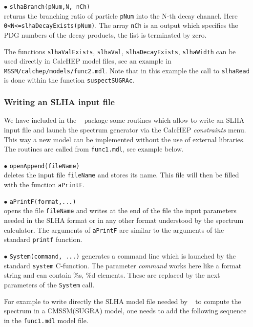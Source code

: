 \documentclass[12pt,a4paper]{article}
\begin{document}
\noindent
$\bullet$ \verb|slhaBranch(pNum,N, nCh)|\\
returns the  branching ratio of  particle \verb|pNum| into the N-th decay channel. Here\\
\noindent \verb|0<N<=slhaDecayExists(pNum)|.
The array \verb|nCh| is an output which specifies the  PDG numbers of the decay products, the list  
is terminated by zero.

The functions \verb|slhaValExists|, \verb|slhaVal|, 
\verb|slhaDecayExists|, \verb|slhaWidth| can be used directly 
in CalcHEP model files, see an example in \\
\verb|MSSM/calchep/models/func2.mdl|. Note that in this example the 
call to \verb|slhaRead| is done within the function \verb|suspectSUGRAc|.


\subsubsection{Writing an SLHA input file}
We have included in the \micro~ package some routines which allow to write
an SLHA input file and launch the spectrum generator via the CalcHEP 
{\it constraints} menu.  This way a new model can be implemented without the use of
external libraries. The routines are called from \verb|func1.mdl|, see example below.

\noindent
$\bullet$ \verb|openAppend(fileName)|\\
deletes the input file \verb|fileName| and stores its name. This file will then be filled with
the function \verb|aPrintF|.

\noindent
$\bullet$ \verb|aPrintF(format,...)|\\
opens the file \verb|fileName| and writes at the end of the file the input parameters needed in the SLHA format or in any other format
understood by the spectrum calculator.  The arguments of 
\verb|aPrintF| are similar to the arguments of the standard \verb|printf| function.

\noindent
$\bullet$ \verb|System(command, ...)|  
generates a command line which is launched by the standard \verb|system|
C-function. The parameter {\it command} works here like a format string and can contain \%s, \%d elements. 
These are replaced by the next parameters  of the \verb|System|  call.

For example to write directly the SLHA model file needed by \suspect~ to compute 
the spectrum in a CMSSM(SUGRA) model, one needs to add the following sequence in the \verb|func1.mdl| model file.
\end{document}
